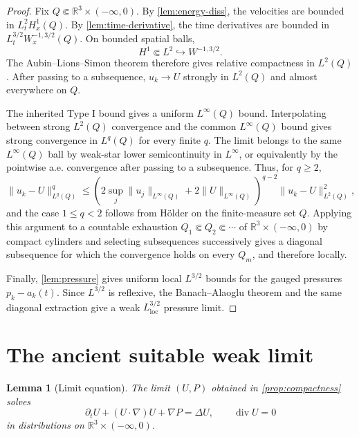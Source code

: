 \documentclass[11pt]{amsart}
\theoremstyle{plain}
\newtheorem{lemma}[theorem]{Lemma}
\theoremstyle{definition}
\theoremstyle{remark}
\numberwithin{equation}{section}
\newcommand{\R}{\mathbb R}
\newcommand{\divergence}{\operatorname{div}}
\begin{document}
\begin{proof}
Fix \(Q\Subset\R^3\times(-\infty,0)\).  By \cref{lem:energy-diss}, the
velocities are bounded in \(L^2_tH^1_x(Q)\).  By
\cref{lem:time-derivative}, the time derivatives are bounded in
\(L^{3/2}_tW^{-1,3/2}_x(Q)\).  On bounded spatial balls,
\[
   H^1\Subset L^2\hookrightarrow W^{-1,3/2}.
\]
The Aubin--Lions--Simon theorem \cite{Aubin1963,LionsMagenes,Simon1987}
therefore gives relative compactness in \(L^2(Q)\).  After passing to a
subsequence,
\(u_k\to U\) strongly in \(L^2(Q)\) and almost everywhere on \(Q\).

The inherited Type I bound gives a uniform \(L^\infty(Q)\) bound.  Interpolating
between strong \(L^2(Q)\) convergence and the common \(L^\infty(Q)\) bound
gives strong convergence in \(L^q(Q)\) for every finite \(q\).  The limit
belongs to the same \(L^\infty(Q)\) ball by weak-star lower semicontinuity in
\(L^\infty\), or equivalently by the pointwise a.e. convergence after passing
to a subsequence.  Thus, for \(q\ge2\),
\[
   \|u_k-U\|_{L^q(Q)}^q
   \le (2\sup_j\|u_j\|_{L^\infty(Q)}+2\|U\|_{L^\infty(Q)})^{q-2}
      \|u_k-U\|_{L^2(Q)}^2,
\]
and the case \(1\le q<2\) follows from Hölder on the finite-measure set
\(Q\).  Applying this argument to a countable exhaustion
\(Q_1\Subset Q_2\Subset\cdots\) of
\(\R^3\times(-\infty,0)\) by compact cylinders and selecting subsequences
successively gives a diagonal subsequence for which the convergence holds on
every \(Q_m\), and therefore locally.

Finally, \cref{lem:pressure} gives uniform local \(L^{3/2}\) bounds for the
gauged pressures \(p_k-a_k(t)\).  Since \(L^{3/2}\) is reflexive, the
Banach--Alaoglu theorem and the same diagonal extraction give a weak
\(L^{3/2}_{\mathrm{loc}}\) pressure limit.
\end{proof}

\section{The ancient suitable weak limit}\label{sec:compactness}

\begin{lemma}[Limit equation]\label{lem:limit-equation}
The limit \((U,P)\) obtained in \cref{prop:compactness} solves
\[
   \partial_tU+(U\cdot\nabla)U+\nabla P=\Delta U,\qquad
   \divergence U=0
\]
in distributions on \(\R^3\times(-\infty,0)\).
\end{lemma}
\end{document}
